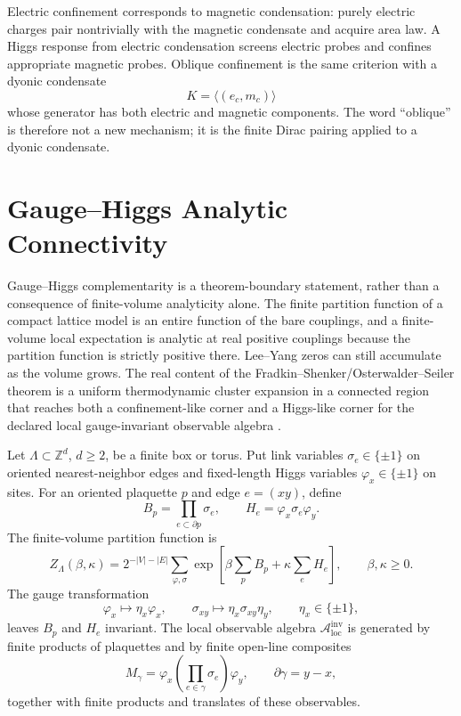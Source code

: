 Electric confinement corresponds to magnetic condensation: purely electric
charges pair nontrivially with the magnetic condensate and acquire area law.
A Higgs response from electric condensation screens electric probes and
confines appropriate magnetic probes.  Oblique confinement is the same
criterion with a dyonic condensate
\[
  K=\langle(e_c,m_c)\rangle
\]
whose generator has both electric and magnetic components.  The word
``oblique'' is therefore not a new mechanism; it is the finite Dirac pairing
applied to a dyonic condensate.

\section{Gauge--Higgs Analytic Connectivity}
\label{sec:gauge-higgs-analytic-connectivity}

Gauge--Higgs complementarity is a theorem-boundary statement, rather than a
consequence of finite-volume analyticity alone.  The finite partition function
of a compact lattice model is an entire function of the bare couplings, and a
finite-volume local expectation is analytic at real positive couplings because
the partition function is strictly positive there.  Lee--Yang zeros can still
accumulate as the volume grows.  The real content of the
Fradkin--Shenker/Osterwalder--Seiler theorem is a uniform thermodynamic
cluster expansion in a connected region that reaches both a confinement-like
corner and a Higgs-like corner for the declared local gauge-invariant
observable algebra \cite{OsterwalderSeiler1978GaugeLattice,
FradkinShenker1979GaugeHiggs}.

\begin{definition}
\label{def:z2-gauge-higgs-fs-datum}
Let \(\Lambda\subset\mathbb Z^d\), \(d\geq2\), be a finite box or torus.  Put
link variables \(\sigma_e\in\{\pm1\}\) on oriented nearest-neighbor edges and
fixed-length Higgs variables \(\varphi_x\in\{\pm1\}\) on sites.  For an
oriented plaquette \(p\) and edge \(e=(xy)\), define
\[
  B_p=\prod_{e\subset\partial p}\sigma_e,\qquad
  H_e=\varphi_x\sigma_e\varphi_y .
\]
The finite-volume partition function is
\begin{equation}
  Z_\Lambda(\beta,\kappa)
  =
  2^{-|V|-|E|}
  \sum_{\varphi,\sigma}
  \exp\!\left[
    \beta\sum_{p} B_p+\kappa\sum_e H_e
  \right],
  \qquad \beta,\kappa\geq0 .
  \label{eq:z2-gauge-higgs-fixed-length-partition}
\end{equation}
The gauge transformation
\[
  \varphi_x\longmapsto \eta_x\varphi_x,\qquad
  \sigma_{xy}\longmapsto \eta_x\sigma_{xy}\eta_y,\qquad
  \eta_x\in\{\pm1\},
\]
leaves \(B_p\) and \(H_e\) invariant.  The local observable algebra
\(\mathcal A_{\mathrm{loc}}^{\mathrm{inv}}\) is generated by finite products
of plaquettes and by finite open-line composites
\[
  M_\gamma
  =
  \varphi_x
  \left(\prod_{e\in\gamma}\sigma_e\right)
  \varphi_y ,
  \qquad \partial\gamma=y-x,
\]
together with finite products and translates of these observables.
\end{definition}

